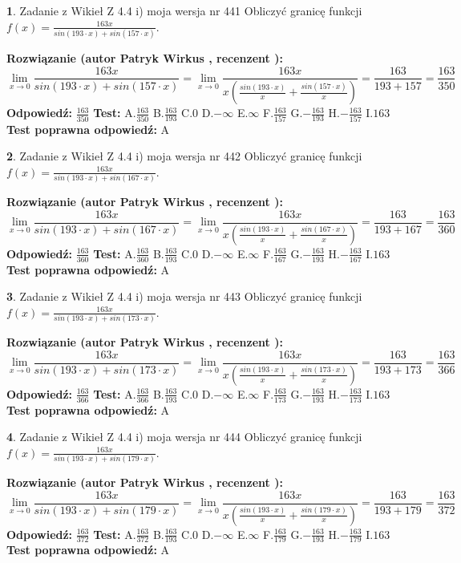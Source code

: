 \documentclass[12pt, a4paper]{article}
\theoremstyle{definition} %
\newtheorem{zad}{}
\newcommand{\zadStart}[1]{\begin{zad}#1\newline}
\newcommand{\zadStop}{\end{zad}}
\newcommand{\rozwStart}[2]{\noindent \textbf{Rozwiązanie (autor #1 , recenzent #2): }\newline}
\newcommand{\rozwStop}{\newline}
\newcommand{\odpStart}{\noindent \textbf{Odpowiedź:}\newline}
\newcommand{\odpStop}{\newline}
\newcommand{\testStart}{\noindent \textbf{Test:}\newline}
\newcommand{\testStop}{\newline}
\newcommand{\kluczStart}{\noindent \textbf{Test poprawna odpowiedź:}\newline}
\newcommand{\kluczStop}{\newline}
\begin{document}
\zadStart{Zadanie z Wikieł Z 4.4 i) moja wersja nr 441}
Obliczyć granicę funkcji $f(x)=\frac{163x}{sin(193\cdot x) +sin(157\cdot x)}$.
\zadStop
\rozwStart{Patryk Wirkus}{}
$$\lim\limits_{x\to 0}\frac{163x}{sin(193\cdot x) +sin(157\cdot x)}=\lim\limits_{x\to 0}\frac{163x}{x(\frac{sin(193\cdot x)}{x}+\frac{sin(157\cdot x)}{x})}=\frac{163}{193+157} = \frac{163}{350}$$
\rozwStop
\odpStart
$\frac{163}{350}$
\odpStop
\testStart
A.$\frac{163}{350}$
B.$\frac{163}{193}$
C.$0$
D.$-\infty$
E.$\infty$
F.$\frac{163}{157}$
G.$-\frac{163}{193}$
H.$-\frac{163}{157}$
I.$163$
\testStop
\kluczStart
A
\kluczStop



\zadStart{Zadanie z Wikieł Z 4.4 i) moja wersja nr 442}
Obliczyć granicę funkcji $f(x)=\frac{163x}{sin(193\cdot x) +sin(167\cdot x)}$.
\zadStop
\rozwStart{Patryk Wirkus}{}
$$\lim\limits_{x\to 0}\frac{163x}{sin(193\cdot x) +sin(167\cdot x)}=\lim\limits_{x\to 0}\frac{163x}{x(\frac{sin(193\cdot x)}{x}+\frac{sin(167\cdot x)}{x})}=\frac{163}{193+167} = \frac{163}{360}$$
\rozwStop
\odpStart
$\frac{163}{360}$
\odpStop
\testStart
A.$\frac{163}{360}$
B.$\frac{163}{193}$
C.$0$
D.$-\infty$
E.$\infty$
F.$\frac{163}{167}$
G.$-\frac{163}{193}$
H.$-\frac{163}{167}$
I.$163$
\testStop
\kluczStart
A
\kluczStop



\zadStart{Zadanie z Wikieł Z 4.4 i) moja wersja nr 443}
Obliczyć granicę funkcji $f(x)=\frac{163x}{sin(193\cdot x) +sin(173\cdot x)}$.
\zadStop
\rozwStart{Patryk Wirkus}{}
$$\lim\limits_{x\to 0}\frac{163x}{sin(193\cdot x) +sin(173\cdot x)}=\lim\limits_{x\to 0}\frac{163x}{x(\frac{sin(193\cdot x)}{x}+\frac{sin(173\cdot x)}{x})}=\frac{163}{193+173} = \frac{163}{366}$$
\rozwStop
\odpStart
$\frac{163}{366}$
\odpStop
\testStart
A.$\frac{163}{366}$
B.$\frac{163}{193}$
C.$0$
D.$-\infty$
E.$\infty$
F.$\frac{163}{173}$
G.$-\frac{163}{193}$
H.$-\frac{163}{173}$
I.$163$
\testStop
\kluczStart
A
\kluczStop



\zadStart{Zadanie z Wikieł Z 4.4 i) moja wersja nr 444}
Obliczyć granicę funkcji $f(x)=\frac{163x}{sin(193\cdot x) +sin(179\cdot x)}$.
\zadStop
\rozwStart{Patryk Wirkus}{}
$$\lim\limits_{x\to 0}\frac{163x}{sin(193\cdot x) +sin(179\cdot x)}=\lim\limits_{x\to 0}\frac{163x}{x(\frac{sin(193\cdot x)}{x}+\frac{sin(179\cdot x)}{x})}=\frac{163}{193+179} = \frac{163}{372}$$
\rozwStop
\odpStart
$\frac{163}{372}$
\odpStop
\testStart
A.$\frac{163}{372}$
B.$\frac{163}{193}$
C.$0$
D.$-\infty$
E.$\infty$
F.$\frac{163}{179}$
G.$-\frac{163}{193}$
H.$-\frac{163}{179}$
I.$163$
\testStop
\kluczStart
A
\kluczStop
\end{document}
